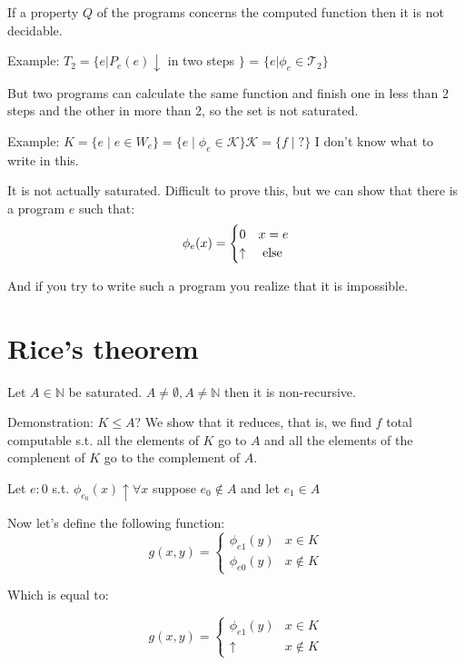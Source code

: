\documentclass{amsbook}
\newcommand{\nat}{\ensuremath{\mathbb{N}}}
\theoremstyle{definition}
\theoremstyle{remark}
\numberwithin{section}{chapter}
\numberwithin{equation}{chapter}
\begin{document}
If a property $Q$ of the programs concerns the computed function then it is not decidable.

Example: $ T_2 = \{ e | P_e(e)\downarrow $ in two steps $ \} $ = $ \{e|\phi_e \in \mathcal{T}_2 \} $

But two programs can calculate the same function and finish one in less than 2 steps and the other in more than 2, so the set is not saturated.

Example: $ K = \{e \mid e\in W_e \} = \{e \mid \phi_e\in \mathcal{K} \} \mathcal{K} = \{f \mid ? \}$ I don't know what to write in this.

It is not actually saturated. Difficult to prove this, but we can show that there is a program $e$ such that:
\begin{equation*}
	\phi_e(x) = \begin{cases}
		0        & x = e    \\
		\uparrow & $ else $
	\end{cases}
\end{equation*}

And if you try to write such a program you realize that it is impossible.

\section {Rice's theorem}
Let $ A \in \nat $ be saturated. $ A \not= \emptyset, A \not= \nat $ then it is non-recursive.

Demonstration: $ K \leq A $? We show that it reduces, that is, we find $f$ total computable s.t. all the elements of $K$ go to $A$ and all the elements of the complenent of $K$ go to the complement of $A$.

Let $ e:0 $ s.t. $ \phi_{e_0}(x)\uparrow\forall x $ suppose $ e_0\not\in A $ and let $ e_1\in A $

Now let's define the following function:
\begin{equation*}
	g(x,y) = \begin{cases}
		\phi_{e1}(y) & x \in K     \\
		\phi_{e0}(y) & x \not\in K
	\end{cases}
\end{equation*}

Which is equal to:

\begin{equation*}
	g(x,y) = \begin{cases}
		\phi_{e1}(y) & x \in K     \\
		\uparrow     & x \not\in K
	\end{cases}
\end{equation*}
\end{document}
